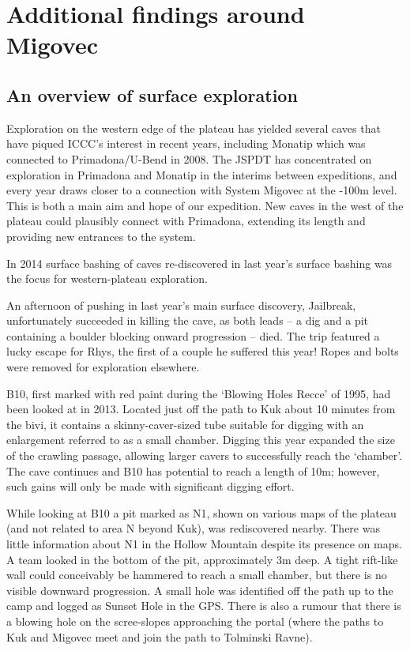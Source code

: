 \section{Additional findings around Migovec}

\subsection{An overview of surface exploration}

Exploration on the western edge of the plateau has yielded several caves that have piqued ICCC’s interest in recent years, including Monatip which was connected to Primadona/U-Bend in 2008. The JSPDT has concentrated on exploration in Primadona and Monatip in the interims between expeditions, and every year draws closer to a connection with System Migovec at the -100m level. This is both a main aim and hope of our expedition. New caves in the west of the plateau could plausibly connect with Primadona, extending its length and providing new entrances to the system.

In 2014 surface bashing of caves re-discovered in last year’s surface bashing was the focus for western-plateau exploration.

An afternoon of pushing in last year’s main surface discovery, Jailbreak, unfortunately succeeded in killing the cave, as both leads – a dig and a pit containing a boulder blocking onward progression – died. The trip featured a lucky escape for Rhys, the first of a couple he suffered this year! Ropes and bolts were removed for exploration elsewhere.

B10, first marked with red paint during the ‘Blowing Holes Recce’ of 1995, had been looked at in 2013. Located just off the path to Kuk about 10 minutes from the bivi, it contains a skinny-caver-sized tube suitable for digging with an enlargement referred to as a small chamber. Digging this year expanded the size of the crawling passage, allowing larger cavers to successfully reach the ‘chamber’. The cave continues and B10 has potential to reach a length of 10m; however, such gains will only be made with significant digging effort. 

While looking at B10 a pit marked as N1, shown on various maps of the plateau (and not related to area N beyond Kuk), was rediscovered nearby. There was little information about N1 in the Hollow Mountain despite its presence on maps. A team looked in the bottom of the pit, approximately 3m deep. A tight rift-like wall could conceivably be hammered to reach a small chamber, but there is no visible downward progression. 
A small hole was identified off the path up to the camp and logged as Sunset Hole in the GPS. There is also a rumour that there is a blowing hole on the scree-slopes approaching the portal (where the paths to Kuk and Migovec meet and join the path to Tolminski Ravne).

